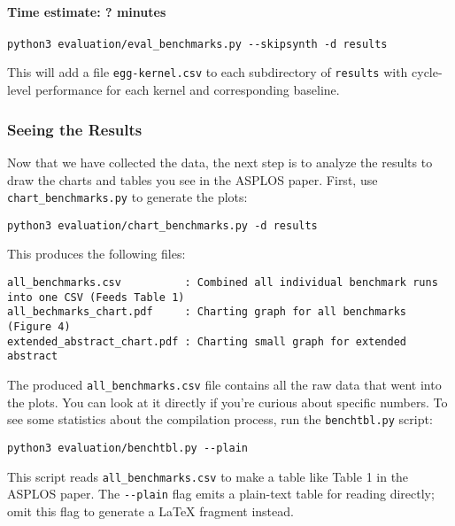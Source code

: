 \hypertarget{time-estimate-minutes}{%
\paragraph{Time estimate: ? minutes}\label{time-estimate-minutes}}

\begin{verbatim}
python3 evaluation/eval_benchmarks.py --skipsynth -d results
\end{verbatim}

This will add a file \texttt{egg-kernel.csv} to each subdirectory of
\texttt{results} with cycle-level performance for each kernel and
corresponding baseline.

\hypertarget{seeing-the-results}{%
\subsubsection{Seeing the Results}\label{seeing-the-results}}

Now that we have collected the data, the next step is to analyze the
results to draw the charts and tables you see in the ASPLOS paper.
First, use \texttt{chart\_benchmarks.py} to generate the plots:

\begin{verbatim}
python3 evaluation/chart_benchmarks.py -d results
\end{verbatim}

This produces the following files:

\begin{verbatim}
all_benchmarks.csv          : Combined all individual benchmark runs into one CSV (Feeds Table 1)
all_bechmarks_chart.pdf     : Charting graph for all benchmarks (Figure 4)
extended_abstract_chart.pdf : Charting small graph for extended abstract
\end{verbatim}

The produced \texttt{all\_benchmarks.csv} file contains all the raw data
that went into the plots. You can look at it directly if you're curious
about specific numbers. To see some statistics about the compilation
process, run the \texttt{benchtbl.py} script:

\begin{verbatim}
python3 evaluation/benchtbl.py --plain
\end{verbatim}

This script reads \texttt{all\_benchmarks.csv} to make a table like
Table 1 in the ASPLOS paper. The \texttt{-\/-plain} flag emits a
plain-text table for reading directly; omit this flag to generate a
LaTeX fragment instead.

